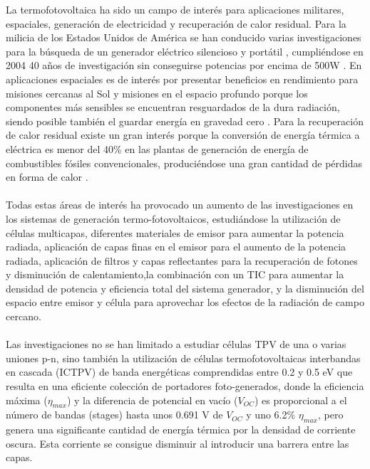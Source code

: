 La termofotovoltaica ha sido un campo de interés para aplicaciones militares, espaciales, generación de electricidad y recuperación de calor residual. Para la milicia de los Estados Unidos de América se han conducido varias investigaciones para la búsqueda de un generador eléctrico silencioso y portátil \cite{military_TPV}, cumpliéndose en 2004 40 años de investigación sin conseguirse potencias por encima de 500W \cite{military_TPV_40Years}. En aplicaciones espaciales es de interés por presentar beneficios en rendimiento para misiones cercanas al Sol y misiones en el espacio profundo porque los componentes más sensibles se encuentran resguardados de la dura radiación, siendo posible también el guardar energía en gravedad cero \cite{TPV_space_applications}. Para la recuperación de calor residual existe un gran interés porque la conversión de energía térmica a eléctrica es menor del 40\% en las plantas de generación de energía de combustibles fósiles convencionales, produciéndose una gran cantidad de pérdidas en forma de calor \cite{wasteHeat_TPV}.\\\\
Todas estas áreas de interés ha provocado un aumento de las investigaciones en los sistemas de generación termo-fotovoltaicos, estudiándose la utilización de células multicapas, diferentes materiales de emisor para aumentar la potencia radiada, aplicación de capas finas en el emisor para el aumento de la potencia radiada\cite{doi:Near_field_ThinFilm}, aplicación de filtros \cite{multiLayerFilters} y capas reflectantes para la recuperación de fotones y disminución de calentamiento\cite{thermoionic_TPV_NF},la combinación con un TIC para aumentar la densidad de potencia y eficiencia total del sistema generador\cite{thermoionic_TPV_NF,progress_Thermoionic_TPV}, y la disminución del espacio entre emisor y célula para aprovechar los efectos de la radiación de campo cercano\cite{thermoionic_TPV_NF,modelEfficiency_NF_TPV,nf_TPV_Pillars_SiO2}.\\\\
Las investigaciones no se han limitado a estudiar células TPV de una o varias uniones p-n, sino también la utilización de células termofotovoltaicas interbandas en cascada (ICTPV) de banda energéticas comprendidas entre 0.2 y 0.5 eV que resulta en una eficiente colección de portadores foto-generados, donde la eficiencia máxima ($\eta_{max}$) y la diferencia de potencial en vacío ($V_{OC}$) es proporcional a el número de bandas (stages) hasta unos 0.691 V de $V_{OC}$ y uno 6.2\% $\eta_{max}$, pero genera una significante cantidad de energía térmica por la densidad de corriente oscura\cite{MultiEstados_Capas_TPVs}. Esta corriente se consigue disminuir al introducir una barrera entre las capas\cite{decreaseDarkCurrent}.\\\\
